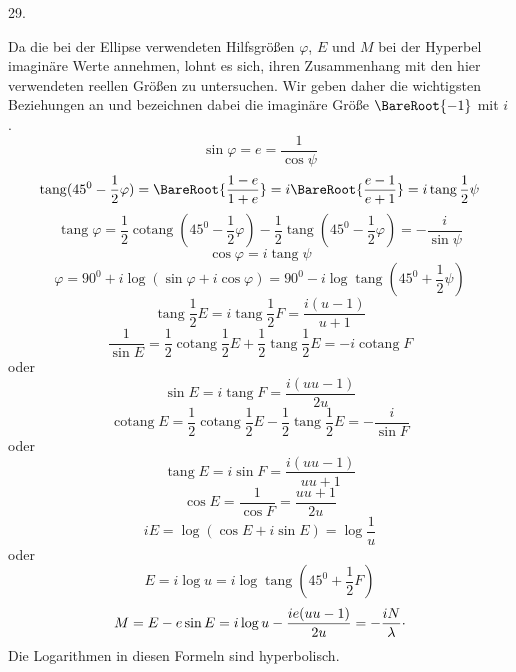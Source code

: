 \par{}
\begin{center}
29.
\end{center}
Da die bei der Ellipse verwendeten Hilfsgrößen $\varphi$, $E$ und $M$ bei der Hyperbel imaginäre Werte annehmen, lohnt es sich, ihren Zusammenhang mit den hier verwendeten reellen Größen zu untersuchen. Wir geben daher die wichtigsten Beziehungen an und bezeichnen dabei die imaginäre Größe $\BareRoot{-1}$ mit $i$.
\[
\sin\varphi=e=\frac{1}{\cos\psi}
\]
\[
\operatorname{tang}(45^0-\frac{1}{2}\varphi)=\BareRoot{\frac{1-e}{1+e}}=i\BareRoot{\frac{e-1}{e+1}}=i\operatorname{tang}\frac{1}{2}\psi
\]
\[
\operatorname{tang}\varphi=\frac{1}{2}\operatorname{cotang}(45^0-\frac{1}{2}\varphi)-\frac{1}{2}\operatorname{tang}(45^0-\frac{1}{2}\varphi)=-\frac{i}{\sin\psi}
\]
\[
\cos\varphi=i\operatorname{tang}\psi
\]
\[
\varphi=90^0+i\log(\sin\varphi+i\cos\varphi)=90^0-i\log\operatorname{tang}(45^0+\frac{1}{2}\psi)
\]
\[
\operatorname{tang}\frac{1}{2}E=i\operatorname{tang}\frac{1}{2}F=\frac{i(u-1)}{u+1}
\]
\[
\frac{1}{\sin E}=\frac{1}{2}\operatorname{cotang}\frac{1}{2}E+\frac{1}{2}\operatorname{tang}\frac{1}{2}E=-i\operatorname{cotang}F
\]
oder
\[
\sin E=i\operatorname{tang}F=\frac{i(uu-1)}{2u}
\]
\[
\operatorname{cotang}E=\frac{1}{2}\operatorname{cotang}\frac{1}{2}E-\frac{1}{2}\operatorname{tang}\frac{1}{2}E=-\frac{i}{\sin F}
\]
oder
\[
\operatorname{tang}E=i\sin F=\frac{i(uu-1)}{uu+1}
\]
\[
\cos E=\frac{1}{\cos F}=\frac{uu+1}{2u}
\]
\[
iE=\log(\cos E+i\sin E)=\log\frac{1}{u}
\]
oder
\[
E=i\log u=i\log\operatorname{tang}(45^0+\frac{1}{2}F)
\]
\[
M=E-e\sin E=i\log u-\frac{ie(uu-1)}{2u}=-\frac{iN}{\lambda}\raisebox{.45ex}{.}
\]
Die Logarithmen in diesen Formeln sind hyperbolisch.

